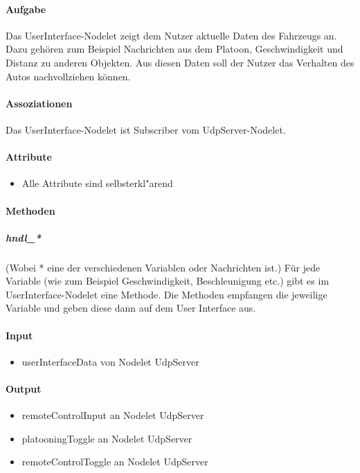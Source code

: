 \documentclass[a4paper, 12pt, titlepage]{scrartcl}
\begin{document}
				\paragraph{Aufgabe} Das UserInterface-Nodelet zeigt dem Nutzer aktuelle Daten des Fahrzeugs an. Dazu gehören zum Beispiel Nachrichten aus dem Platoon, Geschwindigkeit und Distanz zu anderen Objekten. Aus diesen Daten soll der Nutzer das Verhalten des Autos nachvollziehen können.
				\paragraph{Assoziationen} Das UserInterface-Nodelet ist Subscriber vom UdpServer-Nodelet.
				\paragraph{Attribute}
					\begin{itemize}
					    \item Alle Attribute sind selbsterkl"arend
					\end{itemize}
				\paragraph{Methoden}
					\subparagraph{hndl\_*} (Wobei * eine der verschiedenen Variablen oder Nachrichten ist.) Für jede Variable (wie zum Beispiel Geschwindigkeit, Beschleunigung etc.) gibt es im UserInterface-Nodelet eine Methode. Die Methoden empfangen die jeweilige Variable und geben diese dann auf dem User Interface aus.
				\paragraph{Input}
				    \begin{itemize}
				        \item userInterfaceData von Nodelet UdpServer
				    \end{itemize}
				\paragraph{Output}
				    \begin{itemize}
				        \item remoteControlInput an Nodelet UdpServer
				        \item platooningToggle an Nodelet UdpServer
				        \item remoteControlToggle an Nodelet UdpServer
				    \end{itemize}
\end{document}

